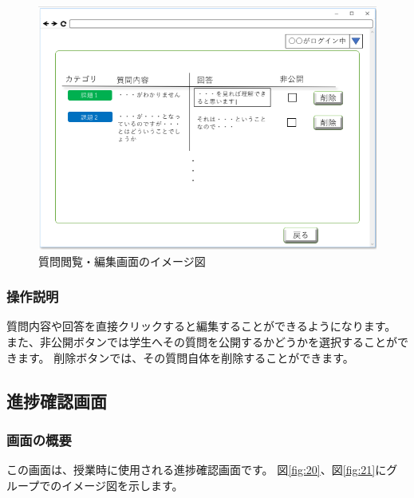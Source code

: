 \begin{figure}[htbp]
\begin{center}
  \includegraphics[width=1\linewidth,clip]{./img/19.png}
  \caption{質問閲覧・編集画面のイメージ図}\label{fig:19}
\end{center}
\end{figure}

\subsubsection{操作説明}
質問内容や回答を直接クリックすると編集することができるようになります。
また、非公開ボタンでは学生へその質問を公開するかどうかを選択することができます。
削除ボタンでは、その質問自体を削除することができます。

\newpage

\subsection{進捗確認画面}
\subsubsection{画面の概要}
この画面は、授業時に使用される進捗確認画面です。
図\ref{fig:20}、図\ref{fig:21}にグループでのイメージ図を示します。

